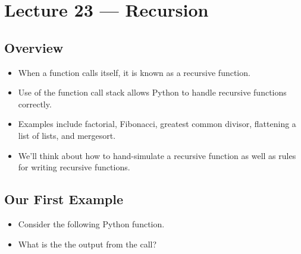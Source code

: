 \documentclass[letterpaper,10pt,english]{sphinxmanual}
\begin{document}
\chapter{Lecture 23 — Recursion}
\label{\detokenize{lecture_notes/lec23_recursion:lecture-23-recursion}}\label{\detokenize{lecture_notes/lec23_recursion::doc}}

\section{Overview}
\label{\detokenize{lecture_notes/lec23_recursion:overview}}\begin{itemize}
\item {} 
When a function calls itself, it is known as a recursive function.

\item {} 
Use of the function call stack allows Python to handle recursive
functions correctly.

\item {} 
Examples include factorial, Fibonacci, greatest common divisor,
flattening a list of lists, and  mergesort.

\item {} 
We’ll think about how to hand-simulate a recursive function as well
as rules for writing recursive functions.

\end{itemize}


\section{Our First Example}
\label{\detokenize{lecture_notes/lec23_recursion:our-first-example}}\begin{itemize}
\item {} 
Consider the following Python function.

%
\begin{sphinxVerbatim}[commandchars=\\\{\}]
 
       
\end{sphinxVerbatim}

\item {} 
What is the the output from the call?

%
\begin{sphinxVerbatim}[commandchars=\\\{\}]
\end{sphinxVerbatim}

\end{itemize}
\end{document}
